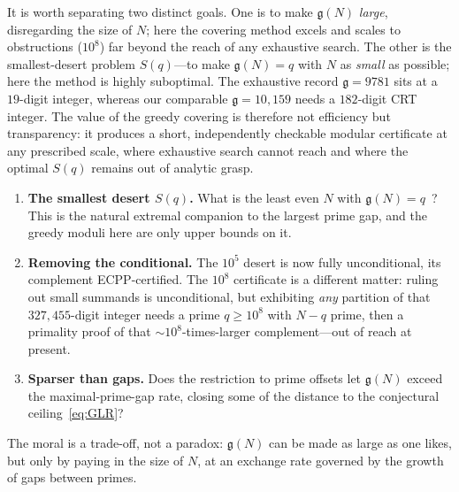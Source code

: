 \documentclass[11pt]{article}
\theoremstyle{plain}
\theoremstyle{definition}
\theoremstyle{remark}
\newcommand{\N}{N}
\newcommand{\g}{\mathfrak{g}}
\begin{document}
It is worth separating two distinct goals. One is to make $\g(\N)$ \emph{large},
disregarding the size of $\N$; here the covering method excels and scales to
obstructions ($10^8$) far beyond the reach of any exhaustive search. The other is
the smallest-desert problem $S(q)$---to make $\g(\N)=q$ with $\N$ as \emph{small}
as possible; here the method is highly suboptimal. The exhaustive record
$\g=9781$ sits at a $19$-digit integer, whereas our comparable $\g=10{,}159$
needs a $182$-digit CRT integer. The value of the greedy covering is therefore
not efficiency but transparency: it produces a short, independently checkable
modular certificate at any prescribed scale, where exhaustive search cannot
reach and where the optimal $S(q)$ remains out of analytic grasp.

\begin{enumerate}
\item \textbf{The smallest desert $S(q)$.} What is the least even $\N$ with
$\g(\N)=q$~\cite{GLvdtR}? This is the natural extremal companion to the largest
prime gap, and the greedy moduli here are only upper bounds on it.
\item \textbf{Removing the conditional.} The $10^5$ desert is now fully
unconditional, its complement ECPP-certified. The $10^8$ certificate is a
different matter: ruling out small summands is unconditional, but exhibiting
\emph{any} partition of that $327{,}455$-digit integer needs a prime $q\ge10^{8}$
with $\N-q$ prime, then a primality proof of that $\sim\!10^{8}$-times-larger
complement---out of reach at present.
\item \textbf{Sparser than gaps.} Does the restriction to prime offsets let
$\g(\N)$ exceed the maximal-prime-gap rate, closing some of the distance to the
conjectural ceiling~\eqref{eq:GLR}?
\end{enumerate}

The moral is a trade-off, not a paradox: $\g(\N)$ can be made as large as one
likes, but only by paying in the size of $\N$, at an exchange rate governed by
the growth of gaps between primes.
\end{document}
